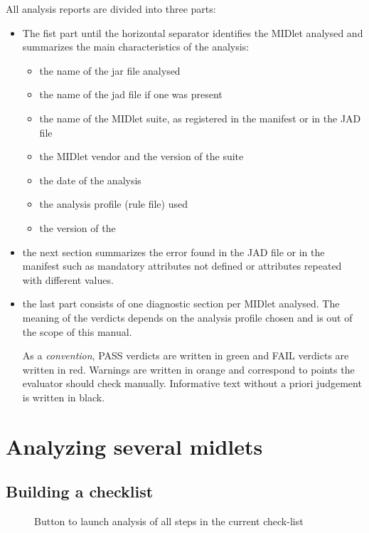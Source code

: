 All analysis reports are divided into three parts:
\begin{itemize}
\item The fist part until the horizontal separator identifies the MIDlet analysed and 
  summarizes the main characteristics of the analysis:
  \begin{itemize}
  \item the name of the jar file analysed
  \item the name of the jad file if one was present
  \item the name of the MIDlet suite, as registered in the manifest or in the JAD file
  \item the MIDlet vendor and the version of the suite
  \item the date of the analysis
  \item the analysis profile (rule file) used
  \item the version of the \ma
  \end{itemize}
\item the next section summarizes the error found in the
  JAD file or in the manifest such as mandatory attributes not defined
  or attributes repeated with different values.
\item the last part consists of one diagnostic section per MIDlet
  analysed. The meaning of the verdicts depends on the analysis profile
  chosen and is out of the scope of this manual. 
  
  As a \emph{convention}, PASS verdicts are written in green and FAIL verdicts are written in
  red. Warnings are written in orange and correspond to points the
  evaluator should check manually. Informative text without a priori judgement
  is written in black.
\end{itemize}

\section{Analyzing several midlets}
\subsection{Building a checklist}
\begin{figure}[h]
	\begin{center}
   	\end{center}
   	\caption{Button to launch analysis of all steps in the current check-list}
   	\label{butAnalyseAll}
\end{figure}

